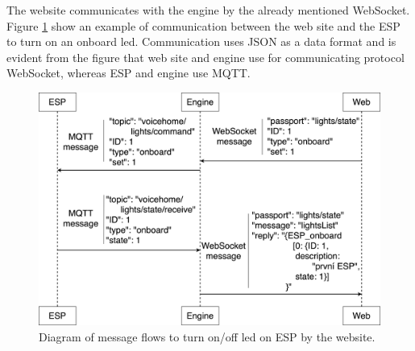 The website communicates with the engine by the already mentioned WebSocket. Figure \ref{fig:lights_onoff_messages} show an example of communication between the web site and the ESP to turn on an onboard led. Communication uses JSON as a data format and is evident from the figure that web site and engine use for communicating protocol WebSocket, whereas ESP and engine use MQTT.

\begin{figure}[H]
	\centering
	\includegraphics[width=\textwidth]{img/lights_onoff_messages.png}
	\caption{Diagram of message flows to turn on/off led on ESP by the website.}
	\label{fig:lights_onoff_messages}
\end{figure}
